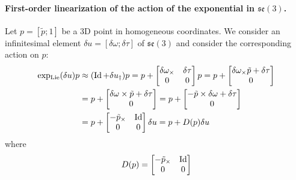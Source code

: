 \paragraph{First-order linearization of the action of the exponential in $\mathfrak{se}(3)$.}
Let $p=[\tilde{p};1]$ be a 3D point in homogeneous coordinates. We consider an infinitesimal element $\delta u=[\delta \omega;\delta \tau]$ of $\mathfrak{se}(3)$ and consider the corresponding action on $p$:
\begin{equation}
\begin{split}
\operatorname{exp_{Lie}}(\delta u)p &\approx (\operatorname{Id}+\delta u_\dagger)p = p +
\begin{bmatrix}
\delta \omega_\times & \delta \tau \\
0  & 0
\end{bmatrix} p
= p +
\begin{bmatrix}
\delta \omega_\times \tilde{p}+\delta \tau \\
0
\end{bmatrix} \\
&= p +
\begin{bmatrix}
\delta \omega \times \tilde{p}+\delta \tau \\
0
\end{bmatrix}
= p +
\begin{bmatrix}
-\tilde{p} \times \delta \omega + \delta \tau \\
0
\end{bmatrix} \\
&= p +
\begin{bmatrix}
-\tilde{p}_\times & \operatorname{Id} \\
0 & 0
\end{bmatrix} \delta u
= p + D(p)\delta u
\end{split}
\end{equation}
where
\begin{equation}
D(p) = 
\begin{bmatrix}
-\tilde{p}_\times & \operatorname{Id} \\
0 & 0
\end{bmatrix}
\end{equation}

